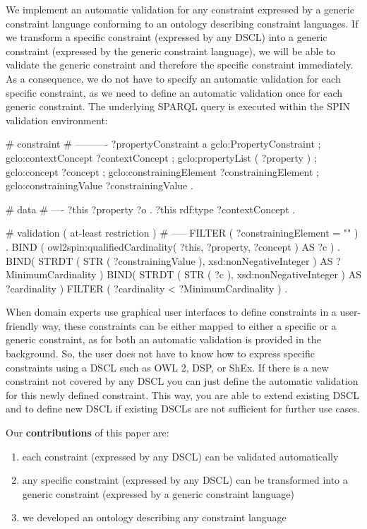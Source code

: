 \documentclass{llncs}
\begin{document}
We implement an automatic validation for any constraint expressed by a generic constraint language conforming to an ontology describing constraint languages.
If we transform a specific constraint (expressed by any DSCL) into a generic constraint (expressed by the generic constraint language), we will be able to validate the generic constraint and therefore the specific constraint immediately. 
As a consequence, we do not have to specify an automatic validation for each specific constraint, as we need to define an automatic validation once for each generic constraint. The underlying SPARQL query is executed within the SPIN validation environment:

\begin{ex}
# constraint
# ----------
?propertyConstraint
    a gclo:PropertyConstraint ;
    gclo:contextConcept ?contextConcept ;
    gclo:propertyList ( ?property ) ;
    gclo:concept ?concept ;
    gclo:constrainingElement ?constrainingElement ;
    gclo:constrainingValue ?constrainingValue .
		
# data
# ----
?this ?property ?o .
?this rdf:type ?contextConcept .

# validation ( at-least restriction )
# -----
FILTER ( ?constrainingElement = "\geq" ) .
BIND ( owl2spin:qualifiedCardinality( ?this, ?property, ?concept ) AS ?c ) .
BIND( STRDT ( STR ( ?constrainingValue ), xsd:nonNegativeInteger ) AS ?MinimumCardinality )
BIND( STRDT ( STR ( ?c ), xsd:nonNegativeInteger ) AS ?cardinality )
FILTER ( ?cardinality < ?MinimumCardinality ) .		  
\end{ex}

When domain experts use graphical user interfaces to define constraints in a user-friendly way, 
these constraints can be either mapped to either a specific or a generic constraint, as for both an automatic validation is provided in the background.    
So, the user does not have to know how to express specific constraints using a DSCL such as OWL 2, DSP, or ShEx.
If there is a new constraint not covered by any DSCL you can just define the automatic validation for this newly defined constraint.
This way, you are able to extend existing DSCL and to define new DSCL if existing DSCLs are not sufficient for further use cases.

Our \textbf{contributions} of this paper are:
\begin{enumerate}
	\item each constraint (expressed by any DSCL) can be validated automatically
	\item any specific constraint (expressed by any DSCL) can be transformed into a generic constraint (expressed by a generic constraint language)
	\item we developed an ontology describing any constraint language
\end{enumerate}
\end{document}
